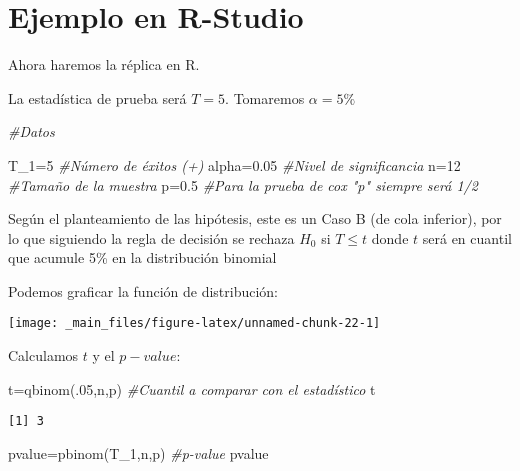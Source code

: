 \documentclass[
  a4paper,
  oneside,
  openany]{book}
\newenvironment{Shaded}{\begin{snugshade}}{\end{snugshade}}
\newcommand{\CommentTok}[1]{\textcolor[rgb]{0.56,0.35,0.01}{\textit{#1}}}
\newcommand{\DecValTok}[1]{\textcolor[rgb]{0.00,0.00,0.81}{#1}}
\newcommand{\FloatTok}[1]{\textcolor[rgb]{0.00,0.00,0.81}{#1}}
\newcommand{\FunctionTok}[1]{\textcolor[rgb]{0.00,0.00,0.00}{#1}}
\newcommand{\NormalTok}[1]{#1}
\newcommand{\OtherTok}[1]{\textcolor[rgb]{0.56,0.35,0.01}{#1}}
\begin{document}
\hypertarget{ejemplo-en-r-studio-4}{%
\section{Ejemplo en R-Studio}\label{ejemplo-en-r-studio-4}}

Ahora haremos la réplica en R.

La estadística de prueba será \(T=5\). Tomaremos \(\alpha=5\%\)

\begin{Shaded}
\begin{Highlighting}[]
\CommentTok{\#Datos}

\NormalTok{T\_1}\OtherTok{=}\DecValTok{5}              \CommentTok{\#Número de éxitos (+)}
\NormalTok{alpha}\OtherTok{=}\FloatTok{0.05}       \CommentTok{\#Nivel de significancia}
\NormalTok{n}\OtherTok{=}\DecValTok{12}              \CommentTok{\#Tamaño de la muestra }
\NormalTok{p}\OtherTok{=}\FloatTok{0.5}            \CommentTok{\#Para la prueba de cox "p" siempre será 1/2}
\end{Highlighting}
\end{Shaded}

Según el planteamiento de las hipótesis, este es un Caso B (de cola inferior), por lo que siguiendo la regla de decisión se rechaza \(H_0\) si \(T\leq t\) donde \(t\) será en cuantil que acumule 5\% en la distribución binomial

Podemos graficar la función de distribución:

\begin{center}\texttt{[image: \_main\_files/figure-latex/unnamed-chunk-22-1]} \end{center}

Calculamos \(t\) y el \(p-value\):

\begin{Shaded}
\begin{Highlighting}[]
\NormalTok{t}\OtherTok{=}\FunctionTok{qbinom}\NormalTok{(.}\DecValTok{05}\NormalTok{,n,p)       }\CommentTok{\#Cuantil a comparar con el estadístico}
\NormalTok{t}
\end{Highlighting}
\end{Shaded}

\begin{verbatim}
[1] 3
\end{verbatim}

\begin{Shaded}
\begin{Highlighting}[]
\NormalTok{pvalue}\OtherTok{=}\FunctionTok{pbinom}\NormalTok{(T\_1,n,p)  }\CommentTok{\#p{-}value}
\NormalTok{pvalue}
\end{Highlighting}
\end{Shaded}
\end{document}
